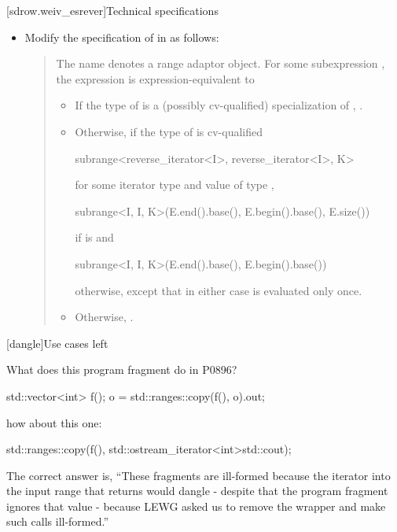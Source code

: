 [sdrow.weiv_esrever]{Technical specifications}

\begin{itemize}
\item Modify the specification of  in
   as follows:
  \begin{quote}
\pnum
The name  denotes a
range adaptor object.
For some subexpression , the expression
 is expression-equivalent to\added{:}
\begin{addedblock}
\begin{itemize}
\item If the type of  is a (possibly cv-qualified)
  specialization of , .
\item Otherwise, if the type of  is cv-qualified
  \begin{codeblock}
  subrange<reverse_iterator<I>, reverse_iterator<I>, K>
  \end{codeblock}
  for some iterator type  and
  value  of type ,
  \begin{codeblock}
  subrange<I, I, K>(E.end().base(), E.begin().base(), E.size())
  \end{codeblock}
  if  is  and
  \begin{codeblock}
  subrange<I, I, K>(E.end().base(), E.begin().base())
  \end{codeblock}
  otherwise, except that in either case  is evaluated only once.
\item Otherwise, .
\end{itemize}
\end{addedblock}
  \end{quote}
\end{itemize}


[dangle]{Use cases left }

What does this program fragment do in P0896?
\begin{codeblock}
std::vector<int> f();
o = std::ranges::copy(f(), o).out;
\end{codeblock}
how about this one:
\begin{codeblock}
std::ranges::copy(f(), std::ostream_iterator<int>{std::cout});
\end{codeblock}
The correct answer is, ``These fragments are ill-formed because the iterator into
the input range that  returns would dangle - despite that
the program fragment ignores that value - because LEWG asked us to remove the
 wrapper and make such calls ill-formed.''


